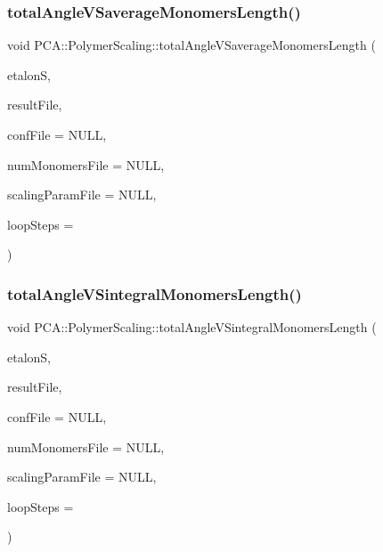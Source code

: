 \subsubsection{\texorpdfstring{total\+Angle\+V\+Saverage\+Monomers\+Length()}{totalAngleVSaverageMonomersLength()}}
{\footnotesize\ttfamily void P\+C\+A\+::\+Polymer\+Scaling\+::total\+Angle\+V\+Saverage\+Monomers\+Length (\begin{DoxyParamCaption}\item[{const \hyperlink{class_p_c_a_1_1_polymer_scaling_1_1_scaling_param}{Scaling\+Param} \&}]{etalonS,  }\item[{F\+I\+LE $\ast$}]{result\+File,  }\item[{F\+I\+LE $\ast$}]{conf\+File = {\ttfamily NULL},  }\item[{F\+I\+LE $\ast$}]{num\+Monomers\+File = {\ttfamily NULL},  }\item[{F\+I\+LE $\ast$}]{scaling\+Param\+File = {\ttfamily NULL},  }\item[{int}]{loop\+Steps = {} }\end{DoxyParamCaption})}

\hypertarget{class_p_c_a_1_1_polymer_scaling_a6c1fbca75891e468b75ac482347232df}{}\label{class_p_c_a_1_1_polymer_scaling_a6c1fbca75891e468b75ac482347232df} 
\subsubsection{\texorpdfstring{total\+Angle\+V\+Sintegral\+Monomers\+Length()}{totalAngleVSintegralMonomersLength()}}
{\footnotesize\ttfamily void P\+C\+A\+::\+Polymer\+Scaling\+::total\+Angle\+V\+Sintegral\+Monomers\+Length (\begin{DoxyParamCaption}\item[{const \hyperlink{class_p_c_a_1_1_polymer_scaling_1_1_scaling_param}{Scaling\+Param} \&}]{etalonS,  }\item[{F\+I\+LE $\ast$}]{result\+File,  }\item[{F\+I\+LE $\ast$}]{conf\+File = {\ttfamily NULL},  }\item[{F\+I\+LE $\ast$}]{num\+Monomers\+File = {\ttfamily NULL},  }\item[{F\+I\+LE $\ast$}]{scaling\+Param\+File = {\ttfamily NULL},  }\item[{int}]{loop\+Steps = {} }\end{DoxyParamCaption})}

